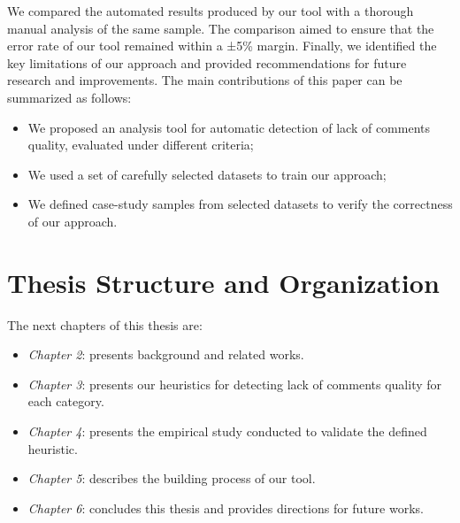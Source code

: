 \noindent We compared the automated results produced by our tool with a thorough manual analysis of the same sample. The comparison aimed to ensure that the error rate of our tool remained within a ±5\% margin. Finally, we identified the key limitations of our approach and provided recommendations for future research and improvements. The main contributions of this paper can be summarized as follows:
\begin{itemize}
    \item We proposed an analysis tool for automatic detection of lack of comments quality, evaluated under different criteria;
    \item We used a set of carefully selected datasets to train our approach;
    \item We defined case-study samples from selected datasets to verify the correctness of our approach.
\end{itemize}

\section{Thesis Structure and Organization}
The next chapters of this thesis are:

\begin{itemize}
\item \textit{Chapter 2}: presents background and related works.
\item \textit{Chapter 3}: presents our heuristics for detecting lack of comments quality for each category.
\item \textit{Chapter 4}: presents the empirical study conducted to validate the
defined heuristic.
\item \textit{Chapter 5}: describes the building process of our tool.
\item \textit{Chapter 6}: concludes this thesis and provides directions for future
works.

\end{itemize}